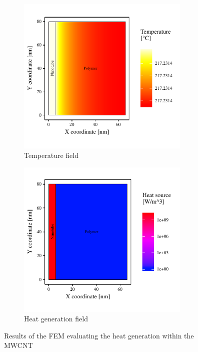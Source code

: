 \documentclass[11pt,review,times]{elsarticle}
\begin{document}
\begin{figure}[htb]
	\centering
	\captionsetup{width=125mm}
	\begin{subfigure}{60mm}
		\centering
		\captionsetup{width=75mm}
		\includegraphics[width=3.25in]{resultats_comsol_axisymetrique_temp}
		\caption{Temperature field}
		\label{fig:temp_axysymmetric}
	\end{subfigure}
	\begin{subfigure}{80mm}
		\centering
		\captionsetup{width=75mm}
		\includegraphics[width=3.25in]{resultats_comsol_axisymetrique_puissance}
		\caption{Heat generation field}
		\label{fig:heat_axysymmetric}
	\end{subfigure}%
	\caption{Results of the FEM evaluating the heat generation within the MWCNT}
	\label{fig:results_axysymmetric}
\end{figure}
\end{document}
